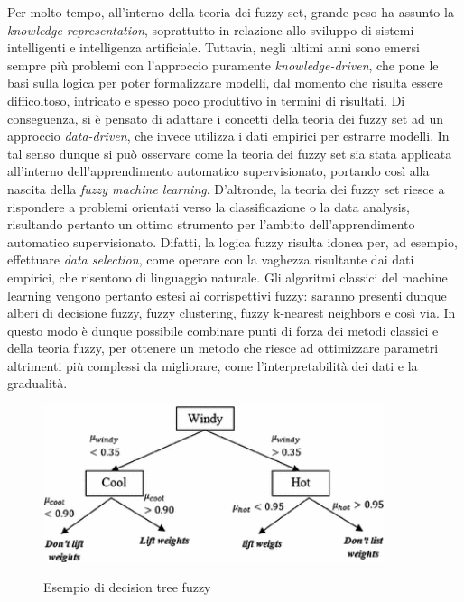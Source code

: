 \documentclass[11pt]{article}
\begin{document}
Per molto tempo, all'interno della teoria dei fuzzy set, grande peso ha assunto la \textit{knowledge representation}, soprattutto in relazione allo sviluppo di sistemi intelligenti e intelligenza artificiale. Tuttavia, negli ultimi anni sono emersi sempre più problemi con l'approccio puramente \textit{knowledge-driven}, che pone le basi sulla logica per poter formalizzare modelli, dal momento che risulta essere difficoltoso, intricato e spesso poco produttivo in termini di risultati. Di conseguenza, si è pensato di adattare i concetti della teoria dei fuzzy set ad un approccio \textit{data-driven}, che invece utilizza i dati empirici per estrarre modelli. In tal senso dunque si può osservare come la teoria dei fuzzy set sia stata applicata all'interno dell'apprendimento automatico supervisionato, portando così alla nascita della \textit{fuzzy machine learning}\cite{fuzzyml}. D'altronde, la teoria dei fuzzy set riesce a rispondere a problemi orientati verso la classificazione o la data analysis, risultando pertanto un ottimo strumento per l'ambito dell'apprendimento automatico supervisionato. Difatti, la logica fuzzy risulta idonea per, ad esempio, effettuare \textit{data selection}, come operare con la vaghezza risultante dai dati empirici, che risentono di linguaggio naturale\cite{fuzzydata}. 
Gli algoritmi classici del machine learning vengono pertanto estesi ai corrispettivi fuzzy: saranno presenti dunque alberi di decisione fuzzy\cite{fuzzydectree}, fuzzy clustering\cite{fcm-intro}, fuzzy k-nearest neighbors\cite{fknn-example1} e così via. In questo modo è dunque possibile combinare punti di forza dei metodi classici e della teoria fuzzy, per ottenere un metodo che riesce ad ottimizzare parametri altrimenti più complessi da migliorare, come l'interpretabilità dei dati e la gradualità. 

\begin{figure}[h!]
\begin{center}
  \includegraphics[width=10cm]{Immagini/fuzzyTreeDecis.png}\\
  \caption{Esempio di decision tree fuzzy}
\end{center}
\end{figure}
\end{document}
